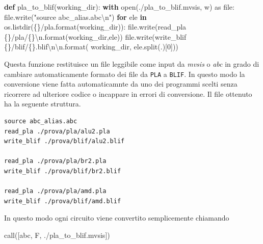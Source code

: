 \documentclass[
  italian,
]{book}
\newenvironment{Shaded}{\begin{snugshade}}{\end{snugshade}}
\newcommand{\BuiltInTok}[1]{#1}
\newcommand{\CharTok}[1]{\textcolor[rgb]{0.31,0.60,0.02}{#1}}
\newcommand{\ControlFlowTok}[1]{\textcolor[rgb]{0.13,0.29,0.53}{\textbf{#1}}}
\newcommand{\DecValTok}[1]{\textcolor[rgb]{0.00,0.00,0.81}{#1}}
\newcommand{\ImportTok}[1]{#1}
\newcommand{\KeywordTok}[1]{\textcolor[rgb]{0.13,0.29,0.53}{\textbf{#1}}}
\newcommand{\NormalTok}[1]{#1}
\newcommand{\SpecialCharTok}[1]{\textcolor[rgb]{0.00,0.00,0.00}{#1}}
\newcommand{\StringTok}[1]{\textcolor[rgb]{0.31,0.60,0.02}{#1}}
\begin{document}
\begin{Shaded}
\begin{Highlighting}[]
\KeywordTok{def}\NormalTok{ pla\_to\_blif(working\_dir):}
  \ControlFlowTok{with} \BuiltInTok{open}\NormalTok{(}\StringTok{\textquotesingle{}./pla\_to\_blif.mvsis\textquotesingle{}}\NormalTok{, }\StringTok{\textquotesingle{}w\textquotesingle{}}\NormalTok{) }\ImportTok{as} \BuiltInTok{file}\NormalTok{:}
    \BuiltInTok{file}\NormalTok{.write(}\StringTok{"source abc\_alias.abc}\CharTok{\textbackslash{}n}\StringTok{"}\NormalTok{)}
    \ControlFlowTok{for}\NormalTok{ ele }\KeywordTok{in}\NormalTok{ os.listdir(}\StringTok{\textquotesingle{}}\SpecialCharTok{\{\}}\StringTok{/pla\textquotesingle{}}\NormalTok{.}\BuiltInTok{format}\NormalTok{(working\_dir)):}
      \BuiltInTok{file}\NormalTok{.write(}\StringTok{\textquotesingle{}read\_pla }\SpecialCharTok{\{\}}\StringTok{/pla/}\SpecialCharTok{\{\}}\CharTok{\textbackslash{}n}\StringTok{\textquotesingle{}}\NormalTok{.}\BuiltInTok{format}\NormalTok{(working\_dir,ele))}
      \BuiltInTok{file}\NormalTok{.write(}\StringTok{\textquotesingle{}write\_blif }\SpecialCharTok{\{\}}\StringTok{/blif/}\SpecialCharTok{\{\}}\StringTok{.blif}\CharTok{\textbackslash{}n\textbackslash{}n}\StringTok{\textquotesingle{}}\NormalTok{.}\BuiltInTok{format}\NormalTok{(}
\NormalTok{        working\_dir, ele.split(}\StringTok{\textquotesingle{}.\textquotesingle{}}\NormalTok{)[}\DecValTok{0}\NormalTok{]))}
\end{Highlighting}
\end{Shaded}

Questa funzione restituisce un file leggibile come input da \emph{mvsis} o \emph{abc} in grado di cambiare automaticamente formato dei file da \texttt{PLA} a \texttt{BLIF}. In questo modo la conversione viene fatta automaticamnte da uno dei programmi scelti senza ricorrere ad ulteriore codice o incappare in errori di conversione. Il file ottenuto ha la seguente struttura.

\begin{verbatim}
source abc_alias.abc
read_pla ./prova/pla/alu2.pla
write_blif ./prova/blif/alu2.blif

read_pla ./prova/pla/br2.pla
write_blif ./prova/blif/br2.blif

read_pla ./prova/pla/amd.pla
write_blif ./prova/blif/amd.blif
\end{verbatim}

In questo modo ogni circuito viene convertito semplicemente chiamando

\begin{Shaded}
\begin{Highlighting}[]
\NormalTok{call([}\StringTok{\textquotesingle{}abc\textquotesingle{}}\NormalTok{, }\StringTok{\textquotesingle{}{-}F\textquotesingle{}}\NormalTok{, }\StringTok{\textquotesingle{}./pla\_to\_blif.mvsis\textquotesingle{}}\NormalTok{])}
\end{Highlighting}
\end{Shaded}
\end{document}
